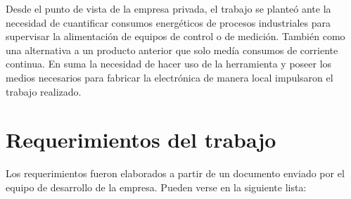 Desde el punto de vista de la empresa privada, el trabajo se planteó ante la necesidad de cuantificar consumos energéticos de procesos industriales para supervisar la alimentación de equipos de control o de medición. También como una alternativa a un producto anterior que solo medía consumos de corriente continua. En suma la necesidad de hacer uso de la herramienta y poseer los medios necesarios para fabricar la electrónica de manera local  impulsaron el trabajo realizado.



\section{Requerimientos del trabajo}
\label{sec:cap2parte2}
Los requerimientos fueron elaborados a partir de un documento enviado por el equipo de desarrollo de la empresa. Pueden verse en la siguiente lista:

